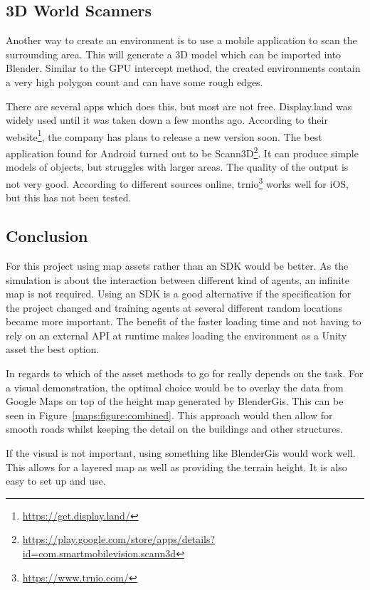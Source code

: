\subsection{3D World Scanners}
Another way to create an environment is to use a mobile application to scan the surrounding area. This will generate a 3D model which can be imported into Blender. Similar to the GPU intercept method, the created environments contain a very high polygon count and can have some rough edges.

There are several apps which does this, but most are not free. Display.land was widely used until it was taken down a few months ago. According to their website\footnote{\url{https://get.display.land/}}, the company has plans to release a new version soon. The best application found for Android turned out to be Scann3D\footnote{\url{https://play.google.com/store/apps/details?id=com.smartmobilevision.scann3d}}. It can produce simple models of objects, but struggles with larger areas. The quality of the output is not very good. According to different sources online, trnio\footnote{\url{https://www.trnio.com/}} works well for iOS, but this has not been tested. 


\subsection{Conclusion}
For this project using map assets rather than an SDK would be better. As the simulation is about the interaction between different kind of agents, an infinite map is not required. Using an SDK is a good alternative if the specification for the project changed and training agents at several different random locations became more important. The benefit of the faster loading time and not having to rely on an external API at runtime makes loading the environment as a Unity asset the best option. 

In regards to which of the asset methods to go for really depends on the task. For a visual demonstration, the optimal choice would be to overlay the data from Google Maps on top of the height map generated by BlenderGis. This can be seen in Figure~\ref{maps:figure:combined}. This approach would then allow for smooth roads whilst keeping the detail on the buildings and other structures. 

If the visual is not important, using something like BlenderGis would work well. This allows for a layered map as well as providing the terrain height. It is also easy to set up and use. 


